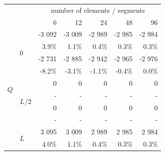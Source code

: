 \begin{figure}[p]
	\centering
	\begin{fullpage}
\begin{tabularx}{0.65\textwidth}{@{} XX rrrrr@{}}
\toprule
& & \multicolumn{5}{c}{number of elements / segments} \\ \cmidrule{3-7}
&  &  6 & 12 & 24 & 48 & 96 \\ 
\midrule
\multirow{12}{*}{$Q$}&\multirow{4}{*}{$0$}&{\color{Tblue}\normalsize-3 092}&{\color{Tblue}\normalsize-3 009}&{\color{Tblue}\normalsize-2 989}&{\color{Tblue}\normalsize-2 985}&{\color{Tblue}\normalsize-2 984}\\
&&{\color{Tblue}\scriptsize3.9\%}&{\color{Tblue}\scriptsize1.1\%}&{\color{Tblue}\scriptsize0.4\%}&{\color{Tblue}\scriptsize0.3\%}&{\color{Tblue}\scriptsize0.3\%}\\
&&{\color{black}\normalsize-2 731}&{\color{black}\normalsize-2 885}&{\color{black}\normalsize-2 942}&{\color{black}\normalsize-2 965}&{\color{black}\normalsize-2 976}\\
&&{\color{black}\scriptsize-8.2\%}&{\color{black}\scriptsize-3.1\%}&{\color{black}\scriptsize-1.1\%}&{\color{black}\scriptsize-0.4\%}&{\color{black}\scriptsize0.0\%}\\\cmidrule[0.5\cmidrulewidth]{2-7}
&\multirow{4}{*}{$L/2$}&{\color{Tblue}\normalsize 0}&{\color{Tblue}\normalsize 0}&{\color{Tblue}\normalsize 0}&{\color{Tblue}\normalsize 0}&{\color{Tblue}\normalsize 0}\\
&&{\color{Tblue}\scriptsize-}&{\color{Tblue}\scriptsize-}&{\color{Tblue}\scriptsize-}&{\color{Tblue}\scriptsize-}&{\color{Tblue}\scriptsize-}\\
&&{\color{black}\normalsize 0}&{\color{black}\normalsize 0}&{\color{black}\normalsize 0}&{\color{black}\normalsize 0}&{\color{black}\normalsize 0}\\
&&{\color{black}\scriptsize-}&{\color{black}\scriptsize-}&{\color{black}\scriptsize-}&{\color{black}\scriptsize-}&{\color{black}\scriptsize-}\\\cmidrule[0.5\cmidrulewidth]{2-7}
&\multirow{4}{*}{$L$}&{\color{Tblue}\normalsize3 095}&{\color{Tblue}\normalsize3 009}&{\color{Tblue}\normalsize2 989}&{\color{Tblue}\normalsize2 985}&{\color{Tblue}\normalsize2 984}\\
&&{\color{Tblue}\scriptsize4.0\%}&{\color{Tblue}\scriptsize1.1\%}&{\color{Tblue}\scriptsize0.4\%}&{\color{Tblue}\scriptsize0.3\%}&{\color{Tblue}\scriptsize0.3\%}\\

\end{tabularx}
\end{fullpage}
\end{figure}
